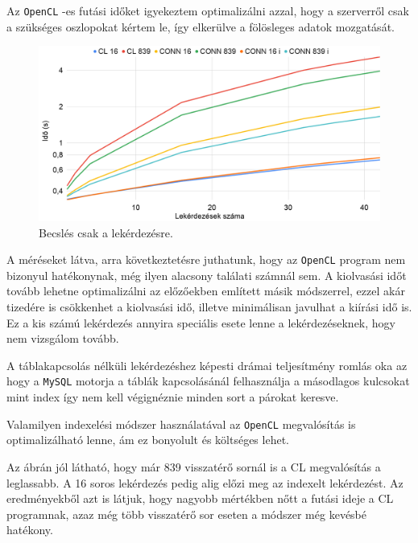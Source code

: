Az \texttt{OpenCL} -es futási időket igyekeztem optimalizálni azzal, hogy a szerverről csak a szükséges oszlopokat kértem le, így elkerülve a fölösleges adatok mozgatását.

\begin{figure}[h!]
\centering
\includegraphics[width=\textwidth]{images/test/join.png}
\caption{Becslés csak a lekérdezésre.}
\label{fig:schema}
\end{figure}

A méréseket látva, arra következtetésre juthatunk, hogy az \texttt{OpenCL} program nem bizonyul hatékonynak, még ilyen alacsony találati számnál sem. A kiolvasási időt tovább lehetne optimalizálni az előzőekben említett másik módszerrel, ezzel akár tizedére is csökkenhet a kiolvasási idő, illetve minimálisan javulhat a kiírási idő is. Ez a kis számú lekérdezés annyira speciális esete lenne a lekérdezéseknek, hogy nem vizsgálom tovább.

A táblakapcsolás nélküli lekérdezéshez képesti drámai teljesítmény romlás oka az hogy a \texttt{MySQL} motorja a táblák kapcsolásánál felhasználja a másodlagos kulcsokat mint index így nem kell végignéznie minden sort a párokat keresve.

Valamilyen indexelési módszer használatával az \texttt{OpenCL} megvalósítás is optimalizálható lenne, ám ez bonyolult és költséges lehet.

Az ábrán jól látható, hogy már 839 visszatérő sornál is a CL megvalósítás a leglassabb. A 16 soros lekérdezés pedig alig előzi meg az indexelt lekérdezést.
Az eredményekből azt is látjuk, hogy nagyobb mértékben nőtt a futási ideje a CL programnak, azaz még több visszatérő sor eseten a módszer még kevésbé hatékony.
